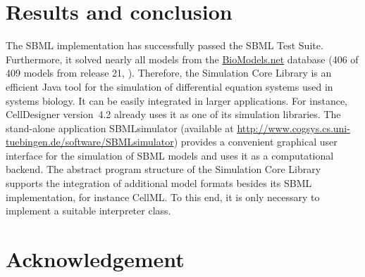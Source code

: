 \documentclass{bioinfo}
\begin{document}


%
%

\section{Results and conclusion}
The SBML implementation has successfully passed the
SBML Test Suite.
Furthermore, it solved nearly all models from the
\href{http://biomodels.net}{BioModels.net} database (406 of 409 models from
release 21, \citealp{Novere2006a}).
Therefore, the Simulation Core Library is an efficient Java tool for the
simulation of differential equation systems used in systems biology. It can be
easily integrated in larger applications. For instance,
CellDesigner version~4.2 \citep{Funahashi2003} already uses it as one of its simulation libraries.
The stand-alone application SBMLsimulator (available at
\href{http://www.cogsys.cs.uni-tuebingen.de/software/SBMLsimulator}{http://www.cogsys.cs.uni-tuebingen.de/software/SBMLsimulator})
provides a convenient graphical user interface for the simulation of SBML
models and uses it as a computational backend.
The abstract program structure of the Simulation Core Library supports the
integration of additional model formats besides its SBML implementation, for
instance CellML. To this end, it is only necessary to implement a suitable
interpreter class.

\section*{Acknowledgement}
\end{document}
